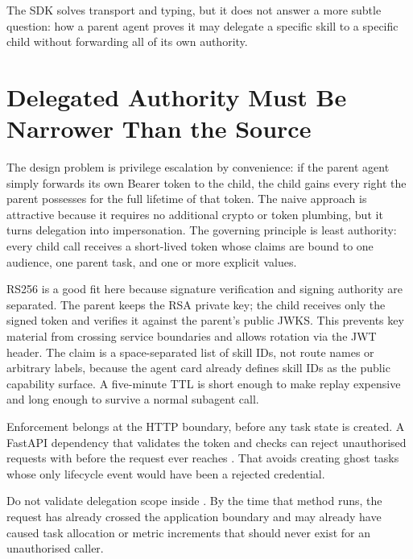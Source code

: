 The SDK solves transport and typing, but it does not answer a more subtle
question: how a parent agent proves it may delegate a specific skill to a
specific child without forwarding all of its own authority.


\section{Delegated Authority Must Be Narrower Than the Source}
\label{sec:a2a-delegation}

The design problem is privilege escalation by convenience: if the parent
agent simply forwards its own Bearer token to the child, the child gains
every right the parent possesses for the full lifetime of that token. The
naive approach is attractive because it requires no additional crypto or
token plumbing, but it turns delegation into impersonation. The governing
principle is least authority: every child call receives a short-lived token
whose claims are bound to one audience, one parent task, and one or more
explicit  values.

RS256 is a good fit here because signature verification and signing
authority are separated. The parent keeps the RSA private key; the child
receives only the signed token and verifies it against the parent's public
JWKS. This prevents key material from crossing service boundaries and
allows rotation via the JWT  header. The  claim is a
space-separated list of skill IDs, not route names or arbitrary labels,
because the agent card already defines skill IDs as the public capability
surface. A five-minute TTL is short enough to make replay expensive and
long enough to survive a normal subagent call.

Enforcement belongs at the HTTP boundary, before any task state is created.
A FastAPI dependency that validates the token and checks
 can reject unauthorised
requests with  before the request ever reaches
. That avoids creating ghost tasks whose
only lifecycle event would have been a rejected credential.

\begin{warningbox}
Do not validate delegation scope inside .
By the time that method runs, the request has already crossed the
application boundary and may already have caused task allocation or metric
increments that should never exist for an unauthorised caller.
\end{warningbox}

